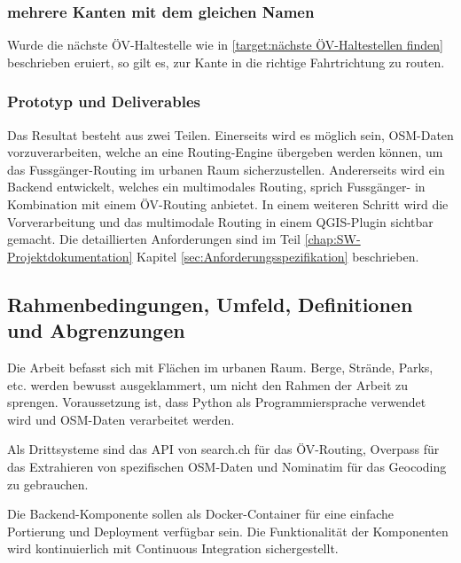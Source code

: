\subsubsection{mehrere Kanten mit dem gleichen Namen}
\label{target:mehrere Kanten mit dem gleichen Namen}
Wurde die nächste ÖV-Haltestelle wie in \ref{target:nächste ÖV-Haltestellen finden} beschrieben eruiert, so gilt es, zur \gls{Kante} in die richtige Fahrtrichtung zu routen.

\subsubsection{Prototyp und Deliverables}
\label{target:Prototyp und Deliverables}
Das Resultat besteht aus zwei Teilen. Einerseits wird es möglich sein, \ac{OSM}-Daten vorzuverarbeiten, welche an eine \gls{Routing-Engine} übergeben werden können, um das Fussgänger-Routing im urbanen Raum sicherzustellen. Andererseits wird ein Backend entwickelt, welches ein multimodales Routing, sprich Fussgänger- in Kombination mit einem ÖV-Routing anbietet. In einem weiteren Schritt wird die Vorverarbeitung und das multimodale Routing in einem QGIS-Plugin sichtbar gemacht. Die detaillierten Anforderungen sind im Teil \ref{chap:SW-Projektdokumentation} Kapitel \ref{sec:Anforderungsspezifikation} beschrieben.
	
\subsection{Rahmenbedingungen, Umfeld, Definitionen und Abgrenzungen}
\label{Rahmenbedingungen, Umfeld, Definitionen, Abgrenzungen}
Die Arbeit befasst sich mit Flächen im urbanen Raum. Berge, Strände, Parks, etc. werden bewusst ausgeklammert, um nicht den Rahmen der Arbeit zu sprengen. Voraussetzung ist, dass Python als Programmiersprache verwendet wird und \ac{OSM}-Daten \cite{osm_data_switzerland} verarbeitet werden.

Als Drittsysteme sind das \ac{API} von search.ch \cite{search_ch_route_api} für das ÖV-Routing, Overpass \cite{wiki:overpass} für das Extrahieren von spezifischen \ac{OSM}-Daten und Nominatim \cite{nominatim_osm} für das \gls{Geocoding} zu gebrauchen.

Die Backend-Komponente sollen als Docker-Container für eine einfache Portierung und Deployment verfügbar sein. Die Funktionalität der Komponenten wird kontinuierlich mit Continuous Integration sichergestellt.

